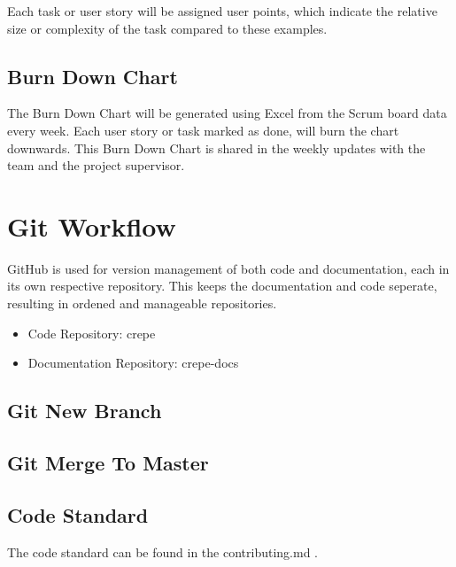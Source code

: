 \documentclass{projdoc}
\begin{document}
\noindent
Each task or user story will be assigned user points, which indicate the relative size or complexity of the task compared to these examples.

\subsection{Burn Down Chart}
The Burn Down Chart will be generated using Excel from the Scrum board data every week.
Each user story or task marked as done, will burn the chart downwards.
This Burn Down Chart is shared in the weekly updates with the team and the project supervisor.


\section{Git Workflow}
GitHub is used for version management of both code and documentation, each in its own respective repository.
This keeps the documentation and code seperate, resulting in ordened and manageable repositories.
\begin{itemize}
	\item Code Repository: crepe \autocite{crepe:code-repo}
	\item Documentation Repository: crepe-docs \autocite{crepe:docs-repo}
\end{itemize}

\subsection{Git New Branch}
\subsection{Git Merge To Master}
\subsection{Code Standard}
The code standard can be found in the contributing.md \autocite{crepe:code-standard}.
\end{document}
